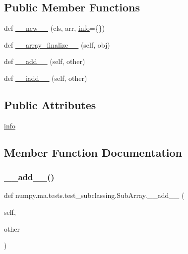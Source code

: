 \subsection*{Public Member Functions}
\begin{DoxyCompactItemize}
\item 
def \hyperlink{classnumpy_1_1ma_1_1tests_1_1test__subclassing_1_1SubArray_aa1e08b4eb97707bdd98e0fa473c651fa}{\+\_\+\+\_\+new\+\_\+\+\_\+} (cls, arr, \hyperlink{classnumpy_1_1ma_1_1tests_1_1test__subclassing_1_1SubArray_a0cae3b0c17520834cb96be34f0295e09}{info}=\{\})
\item 
def \hyperlink{classnumpy_1_1ma_1_1tests_1_1test__subclassing_1_1SubArray_a3b93be5eecd7b218b620b9c13e16e5dd}{\+\_\+\+\_\+array\+\_\+finalize\+\_\+\+\_\+} (self, obj)
\item 
def \hyperlink{classnumpy_1_1ma_1_1tests_1_1test__subclassing_1_1SubArray_aa221453909113f7f56b1d71e15475d5e}{\+\_\+\+\_\+add\+\_\+\+\_\+} (self, other)
\item 
def \hyperlink{classnumpy_1_1ma_1_1tests_1_1test__subclassing_1_1SubArray_aa14ca6209def45886faad66a7c992476}{\+\_\+\+\_\+iadd\+\_\+\+\_\+} (self, other)
\end{DoxyCompactItemize}
\subsection*{Public Attributes}
\begin{DoxyCompactItemize}
\item 
\hyperlink{classnumpy_1_1ma_1_1tests_1_1test__subclassing_1_1SubArray_a0cae3b0c17520834cb96be34f0295e09}{info}
\end{DoxyCompactItemize}


\subsection{Member Function Documentation}
\mbox{\label{classnumpy_1_1ma_1_1tests_1_1test__subclassing_1_1SubArray_aa221453909113f7f56b1d71e15475d5e}} 
\subsubsection{\texorpdfstring{\+\_\+\+\_\+add\+\_\+\+\_\+()}{\_\_add\_\_()}}
{\footnotesize\ttfamily def numpy.\+ma.\+tests.\+test\+\_\+subclassing.\+Sub\+Array.\+\_\+\+\_\+add\+\_\+\+\_\+ (\begin{DoxyParamCaption}\item[{}]{self,  }\item[{}]{other }\end{DoxyParamCaption})}

